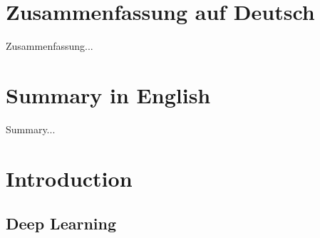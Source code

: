 \documentclass[a4paper, 11pt, oneside]{scrartcl}
\theoremstyle{break}
\numberwithin{equation}{section}
\begin{document}
	\thispagestyle{empty}
	\section*{Zusammenfassung auf Deutsch}
		Zusammenfassung...

	\section*{Summary in English}
		Summary...
	\newpage

	\thispagestyle{empty}
	\tableofcontents
	\thispagestyle{empty}
	\newpage

	\section{Introduction}
	\setcounter{page}{1}

		\subsection{Deep Learning}
\end{document}
